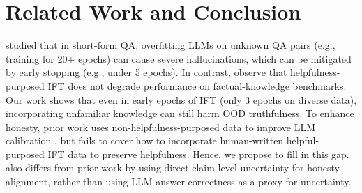 \section{Related Work and Conclusion}
\citet{gekhman-etal-2024-fine} studied that in short-form QA, overfitting LLMs on unknown QA pairs (e.g., training for 20+ epochs) can cause severe hallucinations, which can be mitigated by early stopping (e.g., under 5 epochs). In contrast, \citet{zhao2024longalignmentsimpletoughtobeat} observe that helpfulness-purposed IFT does not degrade performance on factual-knowledge benchmarks. Our work shows that even in early epochs of IFT (only 3 epochs on diverse data), incorporating unfamiliar knowledge can still harm OOD truthfulness.
To enhance honesty, prior work uses non-helpfulness-purposed data to improve LLM calibration \citep{band2024linguisticcalibrationlongformgenerations,yang2024logulongformgenerationuncertainty,yang2024alignmenthonesty,xu2024rejectionimprovesreliabilitytraining,zhang2024rtuninginstructinglargelanguage}, but fails to cover how to incorporate human-written helpful-purposed IFT data to preserve helpfulness. Hence, we propose \algname\space to fill in this gap. \algname\space also differs from prior work by using direct claim-level uncertainty \citep{fadeeva-etal-2024-fact} for honesty alignment, rather than using LLM answer correctness as a proxy for uncertainty.